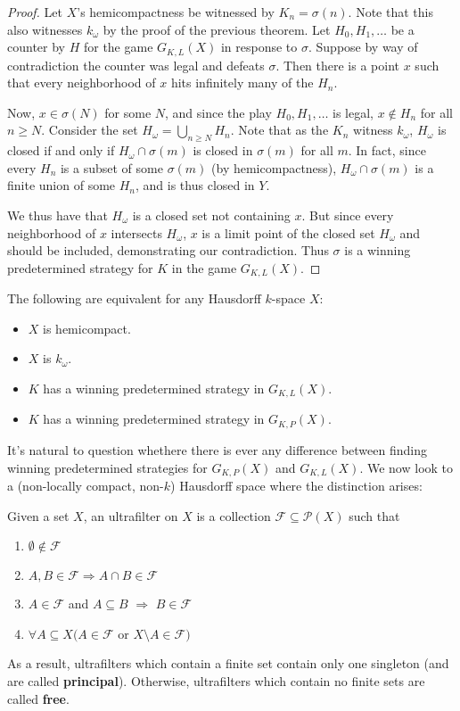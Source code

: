 \begin{proof}
Let $X$'s hemicompactness be witnessed by $K_n=\sigma(n)$. Note that this also witnesses $k_\omega$ by the proof of the previous theorem. Let $H_0,H_1,\dots$ be a counter by $H$ for the game $G_{K,L}(X)$ in response to $\sigma$. Suppose by way of contradiction the counter was legal and defeats $\sigma$. Then there is a point $x$ such that every neighborhood of $x$ hits infinitely many of the $H_n$.

Now, $x\in\sigma(N)$ for some $N$, and since the play $H_0,H_1,\dots$ is legal, $x\not\in H_n$ for all $n\geq N$. Consider the set $H_\omega=\bigcup_{n\geq N} H_n$. Note that as the $K_n$ witness $k_\omega$, $H_\omega$ is closed if and only if $H_\omega \cap \sigma(m)$ is closed in $\sigma(m)$ for all $m$. In fact, since every $H_n$ is a subset of some $\sigma(m)$ (by hemicompactness), $H_\omega \cap \sigma(m)$ is a finite union of some $H_n$, and is thus closed in $Y$.

We thus have that $H_\omega$ is a closed set not containing $x$. But since every neighborhood of $x$ intersects $H_\omega$, $x$ is a limit point of the closed set $H_\omega$ and should be included, demonstrating our contradiction. Thus $\sigma$ is a winning predetermined strategy for $K$ in the game $G_{K,L}(X)$.
\end{proof}

\begin{cor}
The following are equivalent for any Hausdorff $k$-space $X$:
  \begin{itemize}
  \item $X$ is hemicompact.
  \item $X$ is $k_{\omega}$.
  \item $K$ has a winning predetermined strategy in $G_{K,L}(X)$.
  \item $K$ has a winning predetermined strategy in $G_{K,P}(X)$.
  \end{itemize}
\end{cor}

It's natural to question whethere there is ever any difference between finding winning predetermined strategies for $G_{K,P}(X)$ and $G_{K,L}(X)$. We now look to a (non-locally compact, non-$k$) Hausdorff space where the distinction arises:

\begin{defn}
Given a set $X$, an ultrafilter on $X$ is a collection $\mathcal{F}\subseteq\mathcal{P}(X)$ such that
    \begin{enumerate}
    \item $\emptyset\not\in \mathcal{F}$
    \item $A,B\in\mathcal{F} \Rightarrow A\cap B \in \mathcal{F}$
    \item $A\in\mathcal{F}$ and $A \subseteq B$ $\Rightarrow$ $B\in\mathcal{F}$
    \item $\forall A \subseteq X(A\in\mathcal{F}$ or $X\setminus A \in \mathcal{F})$
    \end{enumerate}
As a result, ultrafilters which contain a finite set contain only one singleton (and are called \textbf{principal}). Otherwise, ultrafilters which contain no finite sets are called \textbf{free}.
\end{defn}

